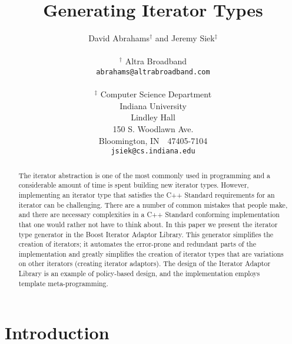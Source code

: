 \documentclass{netobjectdays}
\begin{document}
\title{Generating Iterator Types}

\author{David Abrahams$^\dag$ and Jeremy Siek$^\ddag$ \\
\\
$^\dag$ Altra Broadband \\
\texttt{abrahams@altrabroadband.com}\\
\\
$^\ddag$ Computer Science Department \\
Indiana University \\
Lindley Hall \\
150 S. Woodlawn Ave. \\
Bloomington, IN\ \ 47405-7104\\
\texttt{jsiek@cs.indiana.edu}
}

\maketitle


\begin{abstract}
The iterator abstraction is one of the most commonly used in
programming and a considerable amount of time is spent building new
iterator types. However, implementing an iterator type that satisfies
the C++ Standard requirements for an iterator can be
challenging. There are a number of common mistakes that people make,
and there are necessary complexities in a C++ Standard conforming
implementation that one would rather not have to think about. In this
paper we present the iterator type generator in the Boost Iterator
Adaptor Library. This generator simplifies the creation of iterators;
it automates the error-prone and redundant parts of the implementation
and greatly simplifies the creation of iterator types that are
variations on other iterators (creating iterator adaptors).  The
design of the Iterator Adaptor Library is an example of policy-based
design, and the implementation employs template meta-programming.
\end{abstract}


\section{Introduction}

\end{document}
